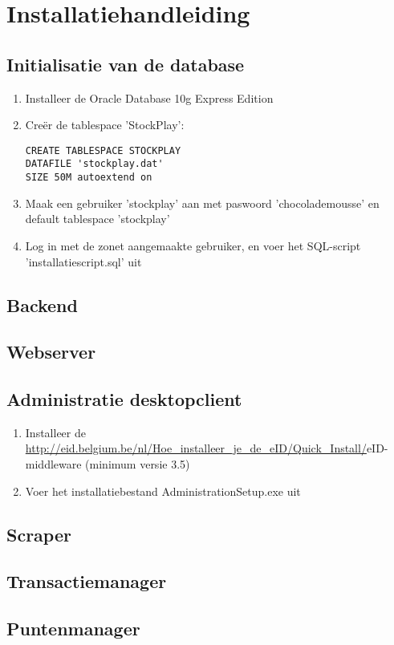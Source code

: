 \section{Installatiehandleiding}

\subsection{Initialisatie van de database}

\begin{enumerate}
\item{Installeer de Oracle Database 10g Express Edition}
\item{Cre\"er de tablespace 'StockPlay': 
\begin{lstlisting}
CREATE TABLESPACE STOCKPLAY 
DATAFILE 'stockplay.dat' 
SIZE 50M autoextend on
\end{lstlisting}}
\item{Maak een gebruiker 'stockplay' aan met paswoord 'chocolademousse' en default tablespace 'stockplay'}
\item{Log in met de zonet aangemaakte gebruiker, en voer het SQL-script 'installatiescript.sql' uit}
\end{enumerate}


\subsection{Backend}

\subsection{Webserver}

\subsection{Administratie desktopclient}
\begin{enumerate}
\item{Installeer de \url{http://eid.belgium.be/nl/Hoe_installeer_je_de_eID/Quick_Install/}{eID-middleware} (minimum versie 3.5)}
\item{Voer het installatiebestand AdministrationSetup.exe uit}
\end{enumerate}

\subsection{Scraper}

\subsection{Transactiemanager}

\subsection{Puntenmanager}


